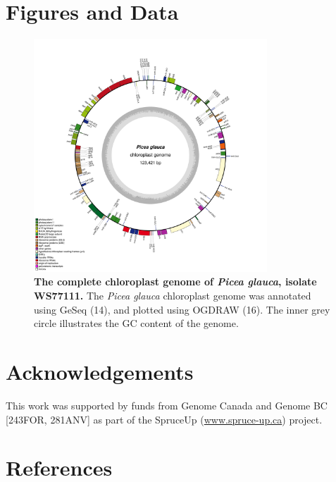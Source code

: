 \documentclass[titlepage,11pt, oneside]{article}   	%
\begin{document}
\section*{Figures and Data}
\begin{figure}[h]
\centering
\includegraphics[width=0.78\textwidth]{WS77111}
\caption{\textbf{The complete chloroplast genome of \textit{Picea glauca}, isolate WS77111.} The \textit{Picea glauca} chloroplast genome was annotated using GeSeq (14), and plotted using OGDRAW (16). The inner grey circle illustrates the GC content of the genome.}
\label{fig:ogdraw}
\end{figure}

\section*{Acknowledgements}
This work was supported by funds from Genome Canada and Genome BC [243FOR, 281ANV] as part of the SpruceUp (\url{www.spruce-up.ca}) project.

\section*{References}
\end{document}
